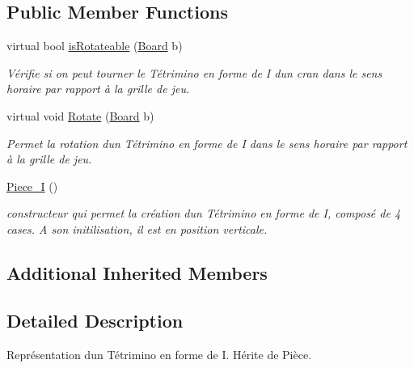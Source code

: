 \subsection*{Public Member Functions}
\begin{DoxyCompactItemize}
\item 
virtual bool \hyperlink{classPiece__I_aec103ce64d2702bf3dc5dbcdb8b450eb}{is\+Rotateable} (\hyperlink{classBoard}{Board} b)
\begin{DoxyCompactList}\small\item\em Vérifie si on peut tourner le Tétrimino en forme de I d\textquotesingle{}un cran dans le sens horaire par rapport à la grille de jeu. \end{DoxyCompactList}\item 
virtual void \hyperlink{classPiece__I_ab7983a575f6d5d41cbf846b6240a9b43}{Rotate} (\hyperlink{classBoard}{Board} b)
\begin{DoxyCompactList}\small\item\em Permet la rotation d\textquotesingle{}un Tétrimino en forme de I dans le sens horaire par rapport à la grille de jeu. \end{DoxyCompactList}\item 
\mbox{\label{classPiece__I_a02fe6ccd07ebfbf22ce8ee6edcdd118e}} 
\hyperlink{classPiece__I_a02fe6ccd07ebfbf22ce8ee6edcdd118e}{Piece\+\_\+I} ()
\begin{DoxyCompactList}\small\item\em constructeur qui permet la création d\textquotesingle{}un Tétrimino en forme de I, composé de 4 cases. A son initilisation, il est en position verticale. \end{DoxyCompactList}\end{DoxyCompactItemize}
\subsection*{Additional Inherited Members}


\subsection{Detailed Description}
Représentation d\textquotesingle{}un Tétrimino en forme de I. Hérite de Pièce. 

